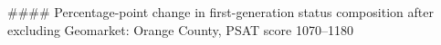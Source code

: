 #### Percentage-point change in first-generation status composition after excluding Geomarket: Orange County, PSAT score 1070–1180
